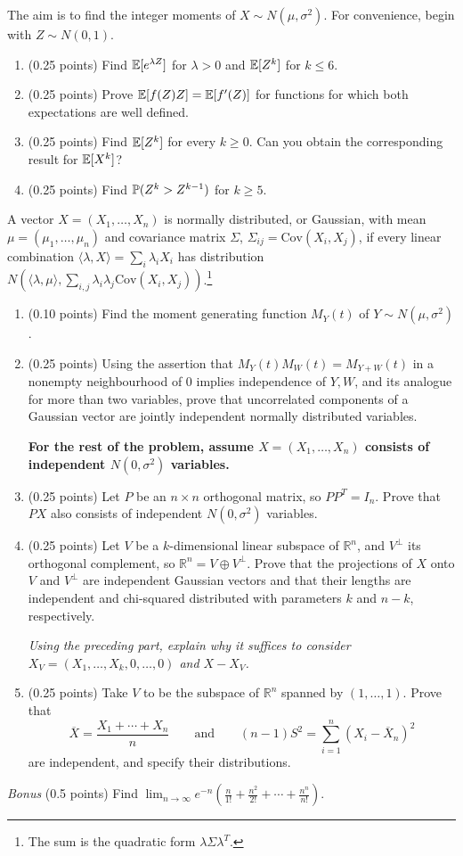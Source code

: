 \documentclass[a4paper]{report}
\begin{document}
\begin{problem}
The aim is to find the integer moments of $X\sim N(\mu,\sigma^2)$. For convenience, begin with $Z\sim N(0,1)$.
\begin{enumerate}
\item (0.25 points) Find $\E[e^{\lambda Z}]$ for $\lambda>0$ and $\E[Z^k]$ for $k\leq6$.
\item (0.25 points) Prove $\E[f(Z)Z]=\E[f'(Z)]$ for functions for which both expectations are well defined.
\item (0.25 points) Find $\E[Z^k]$ for every $k\geq0$. Can you obtain the corresponding result for $\E[X^k]$?
\item (0.25 points) Find $\P(Z^k>Z^{k-1})$ for $k\geq5$.
\end{enumerate}
\end{problem}
\begin{problem}
A vector $X=(X_1,\ldots,X_n)$ is normally distributed, or Gaussian, with mean $\mu=(\mu_1,\ldots,\mu_n)$ and covariance matrix $\Sigma$, $\Sigma_{ij}=\mathrm{Cov}(X_i,X_j)$, if every linear combination $\langle\lambda,X\rangle=\sum_i\lambda_iX_i$ has distribution
$N(\langle\lambda,\mu\rangle,\sum_{i,j}\lambda_i\lambda_j\mathrm{Cov}(X_i,X_j))$.\footnote{The sum is the quadratic form $\lambda\Sigma\lambda^T$.}
\begin{enumerate}
\item (0.10 points) Find the moment generating function $M_Y(t)$ of $Y\sim N(\mu,\sigma^2)$.
\item (0.25 points) Using the assertion that $M_Y(t)M_W(t)=M_{Y+W}(t)$ in a nonempty neighbourhood of 0 implies independence of $Y,W$, and its analogue for more than two variables, prove that uncorrelated components of a Gaussian vector are jointly independent normally distributed variables.

\textbf{For the rest of the problem, assume $X=(X_1,\ldots,X_n)$ consists of independent $N(0,\sigma^2)$ variables.}
\item (0.25 points) Let $P$ be an $n\times n$ orthogonal matrix, so $PP^T=I_n$. Prove that $PX$ also consists of independent $N(0,\sigma^2)$ variables.
\item (0.25 points) Let $V$ be a $k$-dimensional linear subspace of $\mathbb R^n$, and $V^\perp$ its orthogonal complement, so $\mathbb R^n=V\oplus V^\perp$. Prove that the projections of $X$ onto $V$ and $V^\perp$ are independent Gaussian vectors and that their lengths are independent and chi-squared distributed with parameters $k$ and $n-k$, respectively.

\emph{Using the preceding part, explain why it suffices to consider $X_V=(X_1,\ldots,X_k,0,\ldots,0)$ and $X-X_V$.}
\item (0.25 points) Take $V$ to be the subspace of $\mathbb R^n$ spanned by $(1,\ldots,1)$. Prove that
\[\overline X=\frac{X_1+\cdots+X_n}{n}\qquad\text{and}\qquad(n-1)S^2=\sum_{i=1}^n(X_i-\overline X_n)^2\]
are independent, and specify their distributions.
\end{enumerate}
\end{problem}
\begin{problem} \emph{Bonus} (0.5 points)
Find $\displaystyle\lim_{n\to\infty}e^{-n}\left(\frac{n}{1!}+\frac{n^2}{2!}+\cdots+\frac{n^n}{n!}\right)$.
\end{problem}
\end{document}

